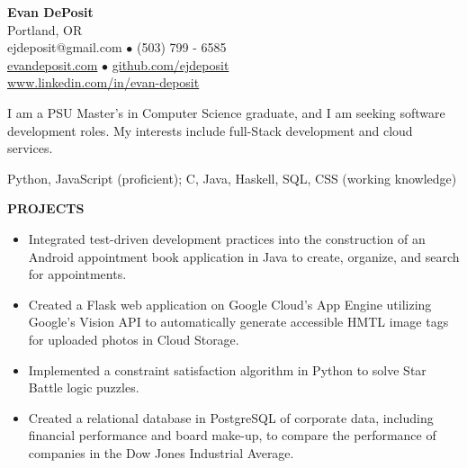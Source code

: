 \documentclass[11pt]{article}
\begin{document}
\thispagestyle{empty}
\begin{center}
\noindent \Large{\textbf{Evan DePosit}}\\
\large{Portland, OR}\\
\large{ejdeposit@gmail.com $\bullet$ (503) 799 - 6585}\\
\href{http://evandeposit.com}{\large{evandeposit.com}} $\bullet$
\href{http://github.com/ejdeposit}{\large{github.com/ejdeposit}}\\
\href{http://www.linkedin.com/in/evan-deposit}{\large{www.linkedin.com/in/evan-deposit}}
\end{center}
\medskip
\begin{description}[style=multiline,leftmargin=3.2cm,font=\normalfont]
\item[\textbf{OBJECTIVE:}] I am a PSU Master's in Computer Science graduate, and I am seeking software development roles. My interests include full-Stack development and cloud services.
\item[\textbf{LANGUAGES:}] Python, JavaScript (proficient); C, Java, Haskell, SQL, CSS (working knowledge)
\end{description}
\noindent
\makebox[0pt][l]{\rule[-.2\baselineskip]{\linewidth}{.3mm}}\large{\textbf{PROJECTS}}
\begin{itemize}[leftmargin=*, itemsep=0pt, topsep=5pt]
	\item Integrated test-driven development practices into the construction of an Android appointment book application in Java to create, organize, and search for appointments.
	\item Created a Flask web application on Google Cloud’s App Engine utilizing Google’s Vision API to automatically generate accessible HMTL image tags for uploaded photos in Cloud Storage.
	\item Implemented a constraint satisfaction algorithm in Python to solve Star Battle logic puzzles.
	\item Created a relational database in PostgreSQL of corporate data, including financial performance and board make-up, to compare the performance of companies in the Dow Jones Industrial Average.
\end{itemize} 
\end{document}

